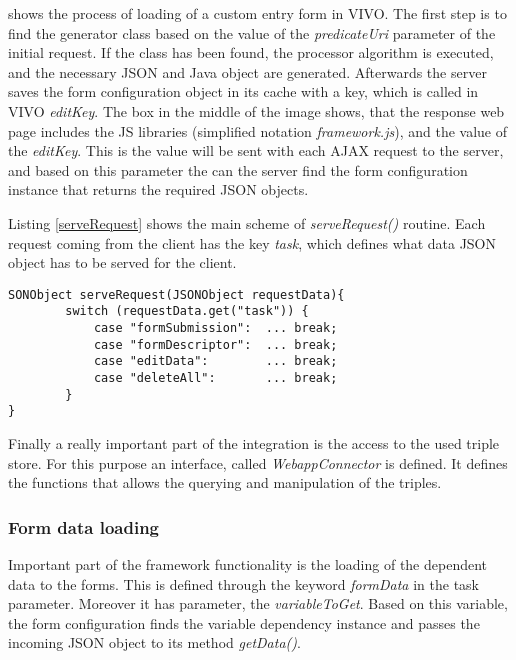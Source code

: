 

 shows the process of loading of a custom entry form in VIVO. The first step is to find the generator class based on the value of the \textit{predicateUri} parameter of the initial request. If the class has been found, the processor algorithm is executed, and the necessary JSON and Java object are generated. Afterwards the server saves the form configuration object in its cache with a key, which is called in VIVO \textit{editKey}. The box in the middle of the image shows, that the response web page includes the JS libraries (simplified notation \textit{framework.js}), and the value of the \textit{editKey}. This is the value will be sent with each AJAX request to the server, and based on this parameter the can the server find the form configuration instance that returns the required JSON objects.



Listing \ref{serveRequest} shows the main scheme of \textit{serveRequest()} routine. Each request coming from the client has the key \textit{task}, which defines what data JSON object has to be served for the client. 

\begin{lstlisting}[basicstyle=\footnotesize, frame=single, caption={AJAX request server routine}, label=serveRequest, captionpos=b, belowskip=1em, aboveskip=2em]
SONObject serveRequest(JSONObject requestData){
		switch (requestData.get("task")) {
			case "formSubmission":  ... break;
			case "formDescriptor":  ... break;
			case "editData":		... break;
			case "deleteAll":		... break;
		}
}
\end{lstlisting}


Finally a really important part of the integration is the access to the used triple store. For this purpose an interface, called \textit{WebappConnector} is defined. It defines the functions that allows the querying and manipulation of the triples.



\subsubsection{Form data loading}


Important part of the framework functionality is the loading of the dependent data to the forms. This is defined through the keyword \textit{formData} in the task parameter. Moreover it has parameter, the \textit{variableToGet}. Based on this variable, the form configuration finds the variable dependency instance and passes the incoming JSON object to its method \textit{getData()}.


